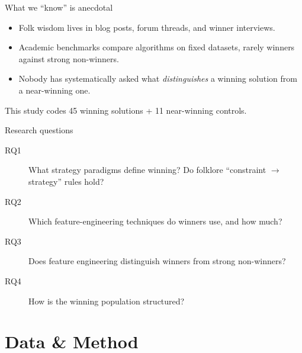 \documentclass[aspectratio=169,11pt]{beamer}
\begin{document}
\begin{frame}{What we ``know'' is anecdotal}
  \begin{itemize}
    \item Folk wisdom lives in blog posts, forum threads, and winner interviews.
    \item Academic benchmarks compare \alert{algorithms} on fixed datasets,
          rarely \alert{winners} against strong non-winners.
    \item Nobody has systematically asked what \emph{distinguishes} a winning
          solution from a near-winning one.
  \end{itemize}
  \vspace{1em}
  \begin{center}
    \alert{\large This study codes 45 winning solutions + 11 near-winning controls.}
  \end{center}
\end{frame}

\begin{frame}{Research questions}
  \begin{description}
    \item[RQ1] What strategy \alert{paradigms} define winning? Do folklore
               ``constraint $\rightarrow$ strategy'' rules hold?
    \item[RQ2] Which feature-engineering techniques do winners use, and how much?
    \item[RQ3] Does feature engineering \alert{distinguish} winners from strong
               non-winners?
    \item[RQ4] How is the winning \alert{population} structured?
  \end{description}
\end{frame}


\section{Data \& Method}
\end{document}
